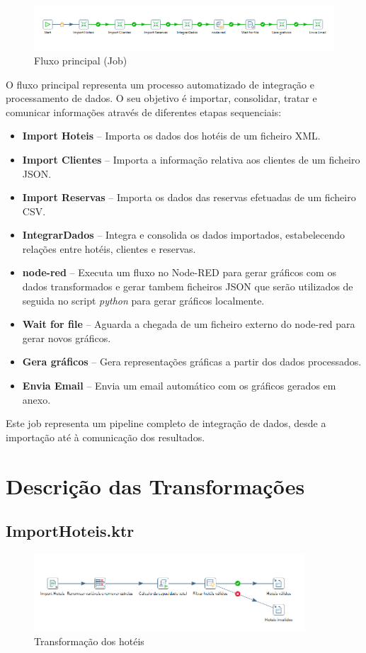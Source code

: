 \documentclass[a4paper, 12pt]{article} %
\begin{document}
\begin{figure}[h] 
	\centering 
	\includegraphics[width=1\textwidth]{images/job.png}
	\caption{Fluxo principal (Job)}
	\label{fig:Job_principal}
\end{figure}
O fluxo principal representa um processo automatizado de integração e processamento de dados. 
O seu objetivo é importar, consolidar, tratar e comunicar informações através de diferentes etapas sequenciais:

\begin{itemize}
	\item \textbf{Import Hoteis} – Importa os dados dos hotéis de um ficheiro XML.
	\item \textbf{Import Clientes} – Importa a informação relativa aos clientes de um ficheiro JSON.
	\item \textbf{Import Reservas} – Importa os dados das reservas efetuadas de um ficheiro CSV.
	\item \textbf{IntegrarDados} – Integra e consolida os dados importados, estabelecendo relações entre hotéis, clientes e reservas.
	\item \textbf{node-red} – Executa um fluxo no Node-RED para gerar gráficos com os dados transformados e gerar tambem ficheiros JSON que serão utilizados de seguida no script \textit{python} para gerar gráficos localmente.
	\item \textbf{Wait for file} – Aguarda a chegada de um ficheiro externo do node-red para gerar novos gráficos.
	\item \textbf{Gera gráficos} – Gera representações gráficas a partir dos dados processados.
	\item \textbf{Envia Email} – Envia um email automático com os gráficos gerados em anexo.
\end{itemize}


Este job representa um pipeline completo de integração de dados, 
desde a importação até à comunicação dos resultados.

\section{Descrição das Transformações}

\subsection{ImportHoteis.ktr}
\begin{figure}[h] 
	\centering 
	\includegraphics[width=0.9\textwidth]{images/hoteis.png}
	\caption{Transformação dos hotéis}
	\label{fig:transformacao_hoteis}
\end{figure}
\end{document}
